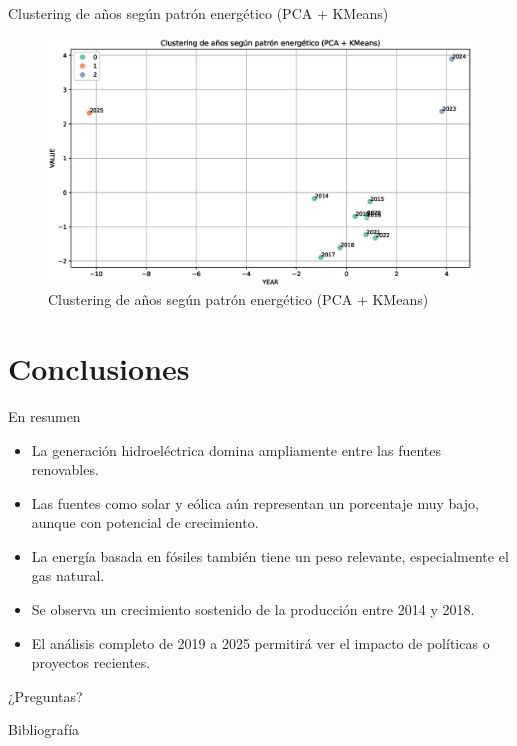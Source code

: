 \documentclass[10pt]{beamer}
\begin{document}
\begin{frame}[fragile]{Clustering de años según patrón energético (PCA + KMeans)}
\begin{figure}[t]
			\centering
			\includegraphics[width=0.9\linewidth]{../../reports/fig_19}
			\caption{Clustering de años según patrón energético (PCA + KMeans)}
			\label{fig:fig19}
\end{figure}
\end{frame}
	
\section[Conclusiones]{Conclusiones}
	
\begin{frame}{En resumen}
\begin{itemize}
		\item La generación hidroeléctrica domina ampliamente entre las fuentes renovables.
		\item Las fuentes como solar y eólica aún representan un porcentaje muy bajo, aunque con potencial de crecimiento.
		\item La energía basada en fósiles también tiene un peso relevante, especialmente el gas natural.
		\item Se observa un crecimiento sostenido de la producción entre 2014 y 2018.
		\item El análisis completo de 2019 a 2025 permitirá ver el impacto de políticas o proyectos recientes.
\end{itemize}
\end{frame}
		
	
\begin{frame}[standout]
	¿Preguntas?
\end{frame}
	
\begin{frame}[allowframebreaks]{Bibliografía}						
	
			
\end{frame}
	
\end{document}
